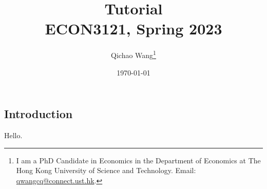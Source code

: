 \documentclass[12pt, a4paper]{article}
\title{Tutorial \\ ECON3121, Spring 2023}
\author{\large Qichao Wang\thanks{I am a PhD Candidate in Economics in the Department of Economics at The Hong Kong University of Science and Technology. Email: \href{mailto:qwangcq@connect.ust.hk}{qwangcq@connect.ust.hk}.}}
\date{\today}
\begin{document}
\maketitle

\begin{onehalfspace}

\setlength{\abovedisplayskip}{3pt}
\setlength{\belowdisplayskip}{3pt}

\section{Introduction}

Hello.


\end{onehalfspace}

\end{document}
